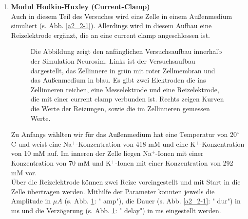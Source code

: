 \documentclass[11pt]{article}
\begin{document}
\begin{enumerate}
\item \textbf{Modul Hodkin-Huxley (Current-Clamp)}\\
Auch in diesem Teil des Versuches wird eine Zelle in einem Außenmedium simuliert (s. Abb. \ref{a2_2-1}). Allerdings wird in diesem Aufbau eine Reizelektrode ergänzt, die an eine current clamp angeschlossen ist. 
\begin{figure}[H]
\caption{Die Abbildung zeigt den anfänglichen Versuchsaufbau innerhalb der Simulation Neurosim. Links ist der Versuchsaufbau dargestellt, das Zellinnere in grün mit roter Zellmembran und das Außenmedium in blau. Es gibt zwei Elektroden die ins Zellinneren reichen, eine Messelektrode und eine Reizelektrode, die mit einer current clamp verbunden ist. Rechts zeigen Kurven die Werte der Reizungen, sowie die im Zellinneren gemessen Werte.}
\label{a2_aufbau1}
\end{figure}
Zu Anfangs wählten wir für das Außenmedium hat eine Temperatur von 20$^\circ$ C und weist eine Na$^+$-Konzentration von 418 mM und eine K$^+$-Konzentration von 10 mM auf. Im inneren der Zelle liegen Na$^+$-Ionen mit einer Konzentration von 70 mM und K$^+$-Ionen mit einer Konzentration von 292 mM vor. \\
Über die Reizelektrode können zwei Reize voreingestellt und mit Start in die Zelle übertragen werden. Mithilfe der Parameter konnten jeweils die Amplitude in $\mu A$ (s. Abb. \ref{a2_aufbau1}: "{} amp"{}), die Dauer (s. Abb. \ref{a2_2-1}: "{} dur"{}) in ms und die Verzögerung (s. Abb. \ref{a2_aufbau1}: "{} delay"{}) in ms eingestellt werden.\\


\end{enumerate}
\end{document}
